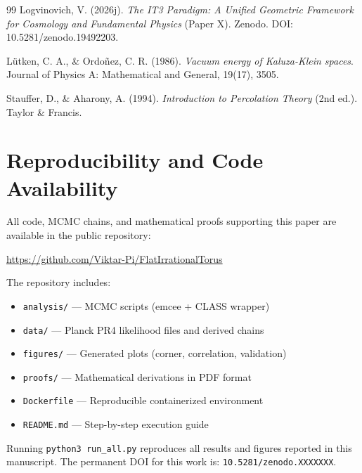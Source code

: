 \documentclass[11pt,a4paper]{article}
\begin{document}
\begin{thebibliography}{99}
Logvinovich, V. (2026j). \textit{The IT3 Paradigm: A Unified Geometric Framework for Cosmology and Fundamental Physics} (Paper X). Zenodo. DOI: 10.5281/zenodo.19492203.

L\"utken, C. A., \& Ordo\~nez, C. R. (1986). \textit{Vacuum energy of Kaluza-Klein spaces}. Journal of Physics A: Mathematical and General, 19(17), 3505.

Stauffer, D., \& Aharony, A. (1994). \textit{Introduction to Percolation Theory} (2nd ed.). Taylor \& Francis.

\end{thebibliography}

\appendix
\section{Reproducibility and Code Availability}
\label{app:reproducibility}

All code, MCMC chains, and mathematical proofs supporting this paper are 
available in the public repository:
\begin{center}
\url{https://github.com/Viktar-Pi/FlatIrrationalTorus}
\end{center}
The repository includes:
\begin{itemize}
    \item \texttt{analysis/} --- MCMC scripts (emcee + CLASS wrapper)
    \item \texttt{data/} --- Planck PR4 likelihood files and derived chains
    \item \texttt{figures/} --- Generated plots (corner, correlation, validation)
    \item \texttt{proofs/} --- Mathematical derivations in PDF format
    \item \texttt{Dockerfile} --- Reproducible containerized environment
    \item \texttt{README.md} --- Step-by-step execution guide
\end{itemize}
Running \texttt{python3 run\_all.py} reproduces all results and figures 
reported in this manuscript. The permanent DOI for this work is: 
\texttt{10.5281/zenodo.XXXXXXX}.
\end{document}
